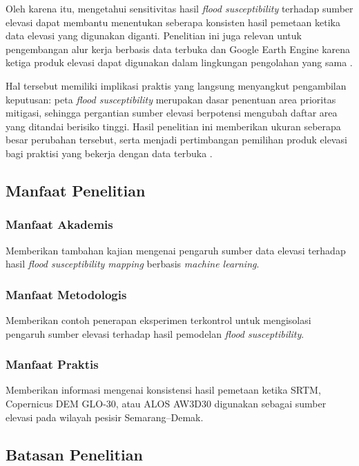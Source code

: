 \documentclass[12pt]{article}
\begin{document}
Oleh karena itu, mengetahui sensitivitas hasil \textit{flood susceptibility}
terhadap sumber elevasi dapat membantu menentukan seberapa konsisten hasil
pemetaan ketika data elevasi yang digunakan diganti. Penelitian ini juga
relevan untuk pengembangan alur kerja berbasis data terbuka dan Google Earth
Engine karena ketiga produk elevasi dapat digunakan dalam lingkungan
pengolahan yang sama \cite{gorelick2017}.

Hal tersebut memiliki implikasi praktis yang langsung menyangkut pengambilan
keputusan: peta \textit{flood susceptibility} merupakan dasar penentuan
area prioritas mitigasi, sehingga pergantian sumber elevasi berpotensi
mengubah daftar area yang ditandai berisiko tinggi. Hasil penelitian ini
memberikan ukuran seberapa besar perubahan tersebut, serta menjadi
pertimbangan pemilihan produk elevasi bagi praktisi yang bekerja dengan
data terbuka \cite{fereshtehpour2024}.

\subsection{Manfaat Penelitian}

\subsubsection{Manfaat Akademis}

Memberikan tambahan kajian mengenai pengaruh sumber data elevasi terhadap
hasil \textit{flood susceptibility mapping} berbasis \textit{machine
learning}.

\subsubsection{Manfaat Metodologis}

Memberikan contoh penerapan eksperimen terkontrol untuk mengisolasi pengaruh
sumber elevasi terhadap hasil pemodelan \textit{flood susceptibility}.

\subsubsection{Manfaat Praktis}

Memberikan informasi mengenai konsistensi hasil pemetaan ketika SRTM,
Copernicus DEM GLO-30, atau ALOS AW3D30 digunakan sebagai sumber elevasi pada
wilayah pesisir Semarang--Demak.

\subsection{Batasan Penelitian}
\end{document}
